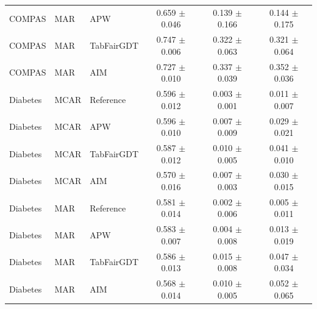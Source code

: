 \begin{table}[tb]
\begin{tabular}{@{}lllccc@{}}
COMPAS    & MAR  & APW                  & 0.659 $\pm$ 0.046 & 0.139 $\pm$ 0.166 & 0.144 $\pm$ 0.175 \\
COMPAS    & MAR  & TabFairGDT           & 0.747 $\pm$ 0.006 & 0.322 $\pm$ 0.063 & 0.321 $\pm$ 0.064 \\
COMPAS    & MAR  & AIM                  & 0.727 $\pm$ 0.010 & 0.337 $\pm$ 0.039 & 0.352 $\pm$ 0.036 \\
\midrule
Diabetes  & MCAR & Reference            & 0.596 $\pm$ 0.012 & 0.003 $\pm$ 0.001 & 0.011 $\pm$ 0.007 \\
Diabetes  & MCAR & APW                  & 0.596 $\pm$ 0.010 & 0.007 $\pm$ 0.009 & 0.029 $\pm$ 0.021 \\
Diabetes  & MCAR & TabFairGDT           & 0.587 $\pm$ 0.012 & 0.010 $\pm$ 0.005 & 0.041 $\pm$ 0.010 \\
Diabetes  & MCAR & AIM                  & 0.570 $\pm$ 0.016 & 0.007 $\pm$ 0.003 & 0.030 $\pm$ 0.015 \\
Diabetes  & MAR  & Reference            & 0.581 $\pm$ 0.014 & 0.002 $\pm$ 0.006 & 0.005 $\pm$ 0.011 \\
Diabetes  & MAR  & APW                  & 0.583 $\pm$ 0.007 & 0.004 $\pm$ 0.008 & 0.013 $\pm$ 0.019 \\
Diabetes  & MAR  & TabFairGDT           & 0.586 $\pm$ 0.013 & 0.015 $\pm$ 0.008 & 0.047 $\pm$ 0.034 \\
Diabetes  & MAR  & AIM                  & 0.568 $\pm$ 0.014 & 0.010 $\pm$ 0.005 & 0.052 $\pm$ 0.065 \\
\bottomrule\end{tabular}
\end{table}
